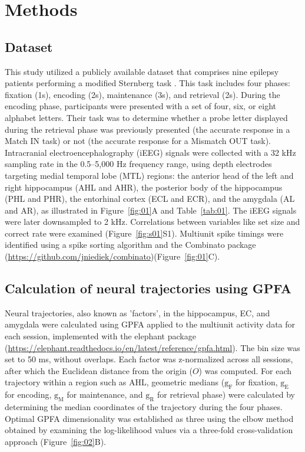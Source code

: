 \section{Methods}
\subsection{Dataset}
This study utilized a publicly available dataset that comprises nine epilepsy patients performing a modified Sternberg task \cite{boran_dataset_2020}. This task includes four phases: fixation (1s), encoding (2s), maintenance (3s), and retrieval (2s). During the encoding phase, participants were presented with a set of four, six, or eight alphabet letters. Their task was to determine whether a probe letter displayed during the retrieval phase was previously presented (the accurate response in a Match IN task) or not (the accurate response for a Mismatch OUT task). Intracranial electroencephalography (iEEG) signals were collected with a 32 kHz sampling rate in the 0.5--5,000 Hz frequency range, using depth electrodes targeting medial temporal lobe (MTL) regions: the anterior head of the left and right hippocampus (AHL and AHR), the posterior body of the hippocampus (PHL and PHR), the entorhinal cortex (ECL and ECR), and the amygdala (AL and AR), as illustrated in Figure~\ref{fig:01}A and Table~\ref{tab:01}. The iEEG signals were later downsampled to 2 kHz. Correlations between variables like set size and correct rate were examined (Figure~\ref{fig:s01}S1). Multiunit spike timings were identified using a spike sorting algorithm \cite{niediek_reliable_2016} and the Combinato package (\url{https://github.com/jniediek/combinato})(Figure~\ref{fig:01}C).

\subsection{Calculation of neural trajectories using GPFA}
Neural trajectories, also known as 'factors', in the hippocampus, EC, and amygdala were calculated using GPFA \cite{yu_gaussian-process_2009} applied to the multiunit activity data for each session, implemented with the elephant package (\url{https://elephant.readthedocs.io/en/latest/reference/gpfa.html}). The bin size was set to 50 ms, without overlaps. Each factor was z-normalized across all sessions, after which the Euclidean distance from the origin ($O$) was computed. For each trajectory within a region such as AHL, geometric medians ($\mathrm{g_{F}}$ for fixation, $\mathrm{g_{E}}$ for encoding, $\mathrm{g_{M}}$ for maintenance, and $\mathrm{g_{R}}$ for retrieval phase) were calculated by determining the median coordinates of the trajectory during the four phases. Optimal GPFA dimensionality was established as three using the elbow method obtained by examining the log-likelihood values via a three-fold cross-validation approach (Figure~\ref{fig:02}B).

